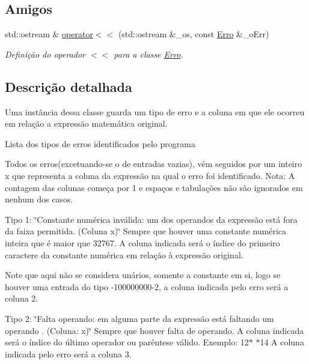 \subsection*{Amigos}
\begin{DoxyCompactItemize}
\item 
\hypertarget{class_erro_a2c0d33bbcdfb4248314e3f73df5f42a5}{std\-::ostream \& \hyperlink{class_erro_a2c0d33bbcdfb4248314e3f73df5f42a5}{operator$<$$<$} (std\-::ostream \&\-\_\-os, const \hyperlink{class_erro}{Erro} \&\-\_\-o\-Err)}\label{class_erro_a2c0d33bbcdfb4248314e3f73df5f42a5}

\begin{DoxyCompactList}\small\item\em Definição do operador $<$$<$ para a classe \hyperlink{class_erro}{Erro}. \end{DoxyCompactList}\end{DoxyCompactItemize}


\subsection{Descrição detalhada}
Uma instância dessa classe guarda um tipo de erro e a coluna em que ele ocorreu em relação a expressão matemática original. 

Lista dos tipos de erros identificados pelo programa

Todos os erros(excetuando-\/se o de entradas vazias), vêm seguidos por um inteiro x que representa a coluna da expressão na qual o erro foi identificado. Nota\-: A contagem das colunas começa por 1 e espaços e tabulações não são ignorados em nenhum dos casos.

Tipo 1\-: \char`\"{}\-Constante numérica inválida\-: um dos operandos da expressão está fora da faixa permitida. (\-Coluna x)\char`\"{} Sempre que houver uma constante numérica inteira que é maior que 32767. A coluna indicada será o índice do primeiro caractere da constante numérica em relação à expressão original.

Note que aqui não se considera unários, somente a constante em si, logo se houver uma entrada do tipo -\/100000000-\/2, a coluna indicada pelo erro será a coluna 2.

Tipo 2\-: \char`\"{}\-Falta operando\-: em alguma parte da expressão está faltando um operando . (\-Coluna\-: x)\char`\"{} Sempre que houver falta de operando. A coluna indicada será o índice do último operador ou parêntese válido. Exemplo\-: 12$\ast$ $\ast$14 A coluna indicada pelo erro será a coluna 3.

